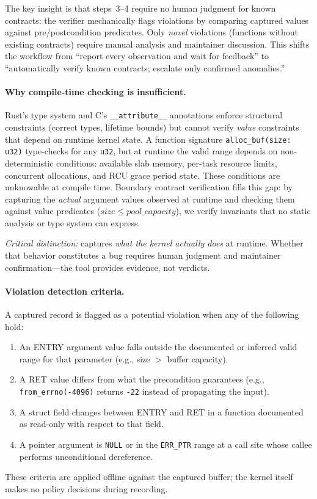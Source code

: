 \documentclass{article}
\begin{document}
The key insight is that steps~3--4 require no human judgment for known
contracts: the verifier mechanically flags violations by comparing captured
values against pre/postcondition predicates. Only \emph{novel} violations
(functions without existing contracts) require manual analysis and maintainer
discussion. This shifts the workflow from ``report every observation and
wait for feedback'' to ``automatically verify known contracts; escalate only
confirmed anomalies.''

\paragraph{Why compile-time checking is insufficient.}
Rust's type system and C's \texttt{\_\_attribute\_\_} annotations enforce
structural constraints (correct types, lifetime bounds) but cannot verify
\emph{value} constraints that depend on runtime kernel state. A function
signature \texttt{alloc\_buf(size: u32)} type-checks for any \texttt{u32},
but at runtime the valid range depends on non-deterministic conditions:
available slab memory, per-task resource limits, concurrent allocations, and
RCU grace period state. These conditions are unknowable at compile time.
Boundary contract verification fills this gap: by capturing the \emph{actual}
argument values observed at runtime and checking them against value predicates
($\mathit{size} \leq \mathit{pool\_capacity}$), we verify invariants that
no static analysis or type system can express.

\emph{Critical distinction:} \toolname{} captures \emph{what the kernel
actually does} at runtime. Whether that behavior constitutes a bug requires
human judgment and maintainer confirmation---the tool provides evidence,
not verdicts.

\paragraph{Violation detection criteria.} A captured record is flagged as a
potential violation when any of the following hold:
\begin{enumerate}[nosep]
  \item An ENTRY argument value falls outside the documented or inferred
        valid range for that parameter (e.g., size $>$ buffer capacity).
  \item A RET value differs from what the precondition guarantees (e.g.,
        \texttt{from\_errno(-4096)} returns \texttt{-22} instead of
        propagating the input).
  \item A struct field changes between ENTRY and RET in a function documented
        as read-only with respect to that field.
  \item A pointer argument is \texttt{NULL} or in the \texttt{ERR\_PTR} range
        at a call site whose callee performs unconditional dereference.
\end{enumerate}
These criteria are applied offline against the captured buffer; the kernel
itself makes no policy decisions during recording.
\end{document}
